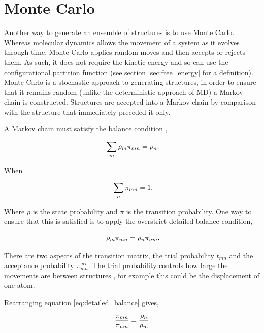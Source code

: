 \section{Monte Carlo} \label{sec:monte_carlo}

Another way to generate an ensemble of structures is to use Monte Carlo.  Whereas molecular dynamics allows the movement of a system as it evolves through time, Monte Carlo applies random moves and then accepts or rejects them.  As such, it does not require the kinetic energy and so can use the configurational partition function (see section \ref{sec:free_energy} for a definition).  Monte Carlo is a stochastic approach to generating structures, in order to ensure that it remains random (unlike the deterministic approach of MD) a Markov chain is constructed.  Structures are accepted into a Markov chain by comparison with the structure that immediately preceded  it only.

A Markov chain must satisfy the balance condition \cite{comp_sim_liquids_book},

\begin{equation}
\ \sum_{m} \rho_m \pi_{mn} = \rho_n \\.
\end{equation}

When

\begin{equation}
\ \sum_n \pi_{mn}=1 \\.
\end{equation}

Where $\rho$ is the state probability and $\pi$ is the transition probability.  One way to ensure that this is satisfied is to apply the overstrict detailed balance condition,

\begin{equation} \label{eq:detailed_balance}
\ \rho_{m} \pi_{mn} = \rho_{n} \pi_{nm} \\.
\end{equation}

There are two aspects of the transition matrix, the trial probability $t_{mn}$ and the acceptance probability $\pi^{acc}_{mn}$.  The trial probability controls how large the movements are between structures \cite{monte_carlo_note_shell}, for example this could be the displacement of one atom.

Rearranging equation \ref{eq:detailed_balance} gives,

\begin{equation}
\ \frac{\pi_{mn}}{\pi_{nm}} = \frac{\rho_n}{\rho_m} \\.
\end{equation}

